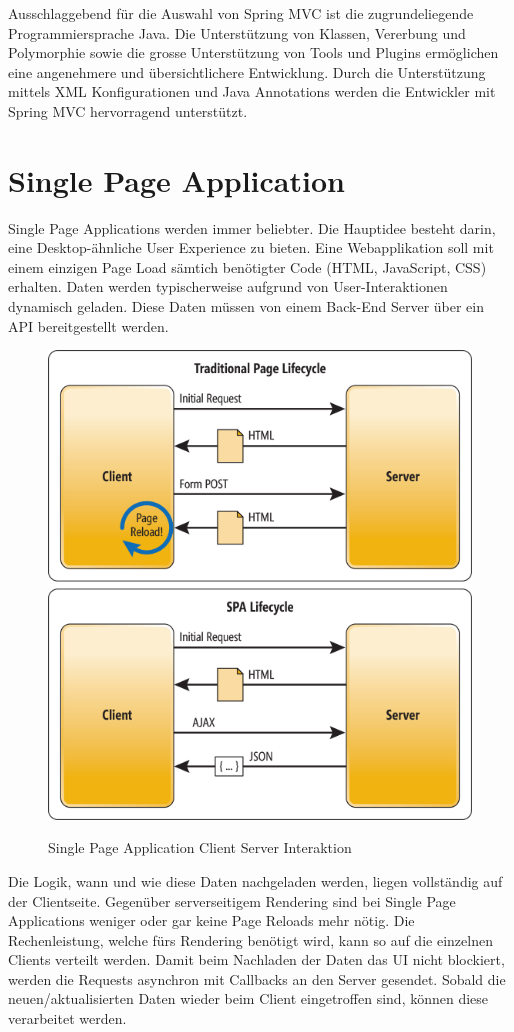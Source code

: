 Ausschlaggebend für die Auswahl von Spring MVC ist die zugrundeliegende Programmiersprache Java. Die Unterstützung von Klassen, Vererbung und Polymorphie sowie die grosse Unterstützung von Tools und Plugins ermöglichen eine angenehmere und übersichtlichere Entwicklung. Durch die Unterstützung mittels XML Konfigurationen und Java Annotations werden die Entwickler mit Spring MVC hervorragend unterstützt.

\newpage
\section{Single Page Application}
Single Page Applications werden immer beliebter. Die Hauptidee besteht darin, eine Desktop-ähnliche User Experience zu bieten. Eine Webapplikation soll mit einem einzigen Page Load sämtich benötigter Code (HTML, JavaScript, CSS) erhalten\cite{HSRSPA}. Daten werden typischerweise aufgrund von User-Interaktionen dynamisch geladen. Diese Daten müssen von einem Back-End Server über ein API bereitgestellt werden.
\begin{figure}[H]
\center
\includegraphics[scale=0.4]{../03_Design/images/single_page_application_lifecycle.png}\caption{Single Page Application Client Server Interaktion}\cite{MSDNSPA}
\end{figure}
Die Logik, wann und wie diese Daten nachgeladen werden, liegen vollständig auf der Clientseite. Gegenüber serverseitigem Rendering sind bei Single Page Applications weniger oder gar keine Page Reloads mehr nötig. Die Rechenleistung, welche fürs Rendering benötigt wird, kann so auf die einzelnen Clients verteilt werden. Damit beim Nachladen der Daten das UI nicht blockiert, werden die Requests asynchron mit Callbacks an den Server gesendet. Sobald die neuen/aktualisierten Daten wieder beim Client eingetroffen sind, können diese verarbeitet werden.

